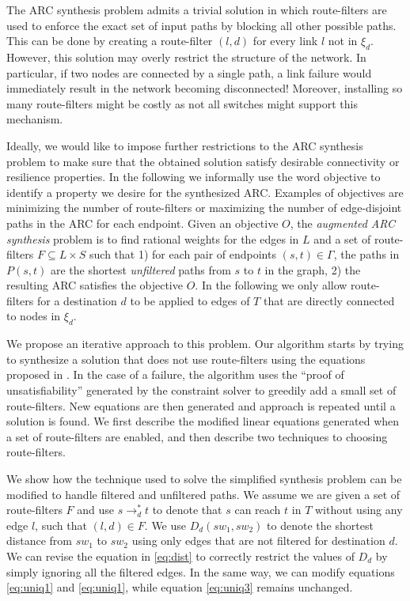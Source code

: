 The ARC synthesis problem admits a trivial solution in which 
route-filters are used to enforce the exact set of input paths by blocking all other possible paths.
This can be done by creating a 
route-filter $(l,d)$ for every link $l$ not in $\xi_d$. 
However, this solution may overly restrict the structure of the network.
In particular, if two nodes are connected by a single path,
a link failure would immediately result in the network becoming disconnected!
Moreover, installing so many route-filters might be costly as not all switches might
support this mechanism.

Ideally, we would like to impose further restrictions to the ARC
synthesis problem to make sure that the obtained solution
satisfy desirable connectivity or resilience properties.
In the following we informally use the word objective 
to identify a property we desire for the synthesized ARC.
Examples of objectives are minimizing the number of route-filters
or maximizing the number of edge-disjoint paths in the ARC
for each endpoint. 
Given an objective $O$, the \emph{augmented ARC synthesis} problem
is to find rational weights for the edges in $L$
and a set of route-filters $F\subseteq L\times S$
 such that 
1) for each pair of endpoints $(s,t) \in \Gamma$, 
the paths in $P(s,t)$ are the shortest \emph{unfiltered} paths from $s$ to $t$ 
in the graph,
2) the resulting ARC satisfies the objective $O$. 
In the following we only allow route-filters for a destination $d$ to be applied to edges of $T$ that are directly connected to 
nodes in $\xi_d$. 

We propose an iterative approach to this problem. 
Our algorithm starts by trying to synthesize a solution
that does not use route-filters using the equations proposed in . 
In the case of a failure, the algorithm uses the ``proof of unsatisfiability'' generated by the constraint solver 
to greedily add a small set of route-filters. New equations are then generated and approach is repeated until a solution is found.
We first describe the 
modified linear equations generated when a set of
route-filters are enabled, and then describe two
techniques to choosing route-filters. 

We show how the technique used to solve the simplified synthesis
problem can be modified to handle filtered and unfiltered paths.
We assume we are given a set of route-filters $F$ and 
use $s\rightarrow_d^* t$ to denote that $s$ can reach $t$
in $T$ without using any edge $l$, such that $(l,d)\in F$.
We use $D_d(sw_1, sw_2)$ to denote the shortest distance from $sw_1$ to $sw_2$
using only edges that are not filtered for destination $d$.
We can revise the equation in \eqref{eq:dist} to correctly restrict the values of $D_d$
by simply ignoring all the filtered edges. 
In the same way, we can modify equations  \eqref{eq:uniq1} and \eqref{eq:uniq1}, while
equation \eqref{eq:uniq3} remains unchanged.

